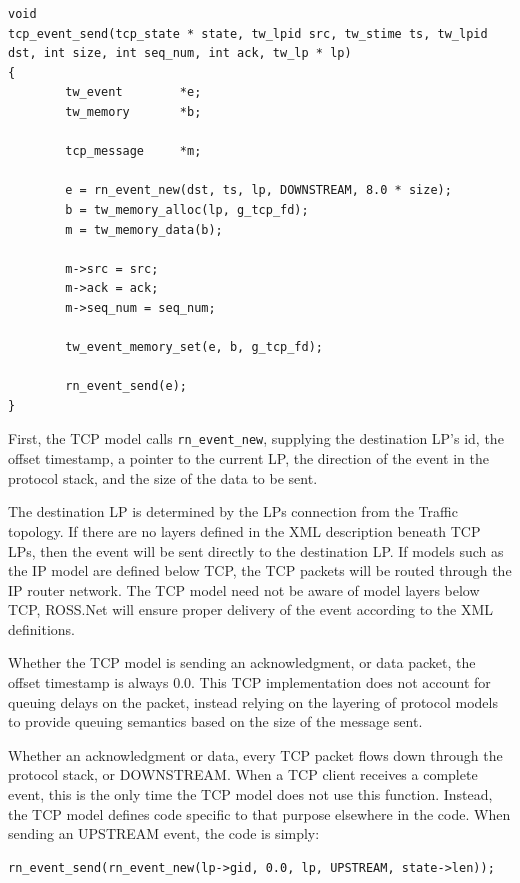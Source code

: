 \documentclass[12pt]{article}
\begin{document}
\begin{small}
\begin{verbatim}
void
tcp_event_send(tcp_state * state, tw_lpid src, tw_stime ts, tw_lpid dst, int size, int seq_num, int ack, tw_lp * lp)
{
        tw_event        *e;
        tw_memory       *b;

        tcp_message     *m;

        e = rn_event_new(dst, ts, lp, DOWNSTREAM, 8.0 * size);
        b = tw_memory_alloc(lp, g_tcp_fd);
        m = tw_memory_data(b);

        m->src = src;
        m->ack = ack;
        m->seq_num = seq_num;

        tw_event_memory_set(e, b, g_tcp_fd);

        rn_event_send(e);
}
\end{verbatim}
\end{small}

First, the TCP model calls {\tt rn\_event\_new}, supplying the destination
LP's id, the offset timestamp, a pointer to the current LP, the direction of
the event in the protocol stack, and the size of the data to be sent.

The destination LP is determined by the LPs connection from the Traffic
topology.  If there are no layers defined in the XML description beneath TCP
LPs, then the event will be sent directly to the destination LP.  If models
such as the IP model are defined below TCP, the TCP packets will be routed
through the IP router network.  The TCP model need not be aware of model
layers below TCP, ROSS.Net will ensure proper delivery of the event according
to the XML definitions.

Whether the TCP model is sending an acknowledgment, or data packet, the
offset timestamp is always 0.0.  This TCP implementation does not account for
queuing delays on the packet, instead relying on the layering of protocol
models to provide queuing semantics based on the size of the message sent.

Whether an acknowledgment or data, every TCP packet flows down through the
protocol stack, or DOWNSTREAM.  When a TCP client receives a complete event,
this is the only time the TCP model does not use this function.  Instead, the
TCP model defines code specific to that purpose elsewhere in the code.  When
sending an UPSTREAM event, the code is simply:

\begin{small}\begin{verbatim}
rn_event_send(rn_event_new(lp->gid, 0.0, lp, UPSTREAM, state->len));
\end{verbatim}\end{small}
\end{document}
